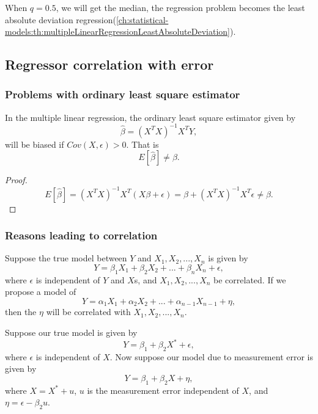 \begin{refsection}
\begin{remark}
When $q = 0.5$, we will get the median, the regression problem becomes the least absolute deviation regression(\autoref{ch:statistical-models:th:multipleLinearRegressionLeastAbsoluteDeviation}). 
\end{remark}


\subsection{Regressor correlation with error}

\subsubsection{Problems with ordinary least square estimator}

\begin{lemma}
In the multiple linear regression, the ordinary least square estimator given by
$$\hat{\beta} = (X^TX)^{-1}X^TY,$$
will be biased if $Cov(X,\epsilon) > 0.$
That is
$$E[\hat{\beta}] \neq \beta.$$	
\end{lemma}
\begin{proof}
$$E[\hat{\beta}] = (X^TX)^{-1}X^T(X\beta+\epsilon) = \beta + (X^TX)^{-1}X^T\epsilon\neq \beta.$$	
\end{proof}

\subsubsection{Reasons leading to correlation}

\begin{remark}
\cite[407]{hill2008principles}
Suppose the true model between $Y$ and $X_1,X_2,...,X_n$ is given by
$$Y = \beta_1X_1+\beta_2X_2+...+\beta_nX_n + \epsilon,$$
where $\epsilon$ is independent of $Y$ and $X$s, and $X_1,X_2,...,X_n$ be correlated. If we propose a model of 
$$Y = \alpha_1X_1+\alpha_2X_2+...+\alpha_{n-1}X_{n-1} + \eta,$$
then the $\eta$ will be correlated with $X_1,X_2,...,X_n$.	
\end{remark}


\begin{remark}\cite[406]{hill2008principles}
Suppose our true model is given by
$$Y = \beta_1 + \beta_2 X^* + \epsilon,$$
where $\epsilon$ is independent of $X$. Now suppose
our model due to measurement error is given by
$$Y = \beta_1 + \beta_2 X + \eta,$$
where $X = X^* + u$, $u$ is the measurement error independent of $X$, and $\eta = \epsilon - \beta_2 u$.


\end{remark}
\end{refsection}
